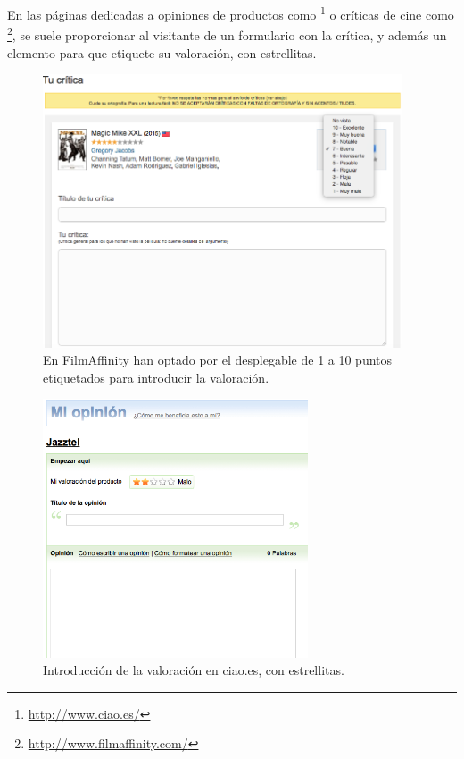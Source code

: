 En las páginas dedicadas a opiniones de productos como \footnote{\url{http://www.ciao.es/}} o críticas de cine como \footnote{\url{http://www.filmaffinity.com/}}, se suele proporcionar al visitante de un formulario con la crítica, y además un elemento para que etiquete su valoración, con estrellitas.

\begin{figure}[htbp]
\centering
\includegraphics[width=0.95\textwidth]{filmaffinity}
\caption[Introducción de la valoración en FilmAffinity]{En FilmAffinity han optado por el desplegable de 1 a 10 puntos etiquetados para introducir la valoración.}
\label{fig:filmaffinity}
\end{figure}

\begin{figure}[htbp]
\centering
\includegraphics[width=0.7\textwidth]{ciao}
\caption[Introducción de la valoración en ciao.es]{Introducción de la valoración en ciao.es, con estrellitas.}
\label{fig:ciao}
\end{figure}

